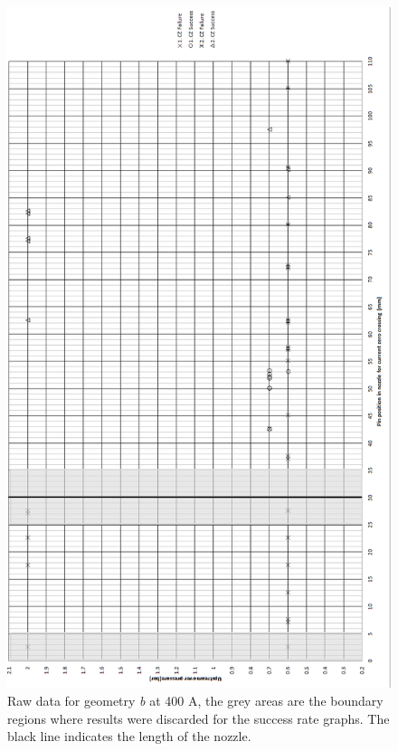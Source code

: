 \documentclass[10pt,a4paper,twoside]{article}
\begin{document}
\begin{figure}[H]
\centering
\includegraphics[scale=0.55]{Bilder/Results/rawData400AgeoB.png}
\caption{Raw data for geometry \textit{b} at 400 A, the grey areas are the boundary regions where results were discarded for the success rate graphs. The black line indicates the length of the nozzle.} \label{fig:rawData400AgeoB}
\end{figure}
\newpage
\end{document}
